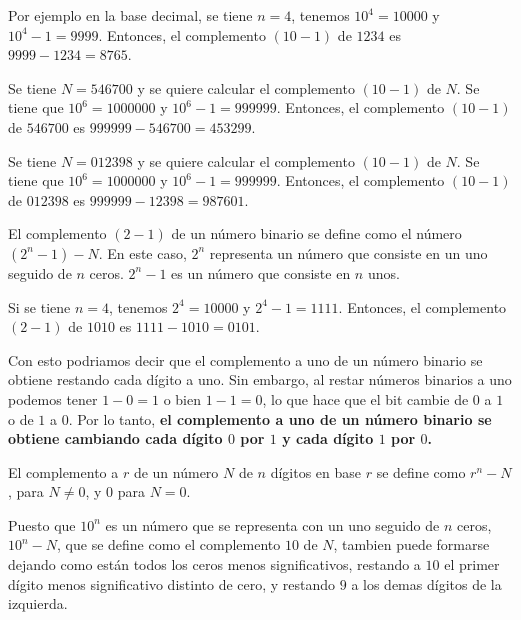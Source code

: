\begin{ejemplo}
    Por ejemplo en la base decimal, se tiene $n=4$, tenemos $10^4 = 10000$ y $10^4 - 1 = 9999$. Entonces, el complemento $(10-1)$ de $1234$ es $9999 - 1234 = 8765$.
\end{ejemplo}

\begin{ejemplo}
    Se tiene $N= 546700$ y se quiere calcular el complemento $(10-1)$ de $N$. Se tiene que $10^6 = 1000000$ y $10^6 - 1 = 999999$. Entonces, el complemento $(10-1)$ de $546700$ es $999999 - 546700 = 453299$.
\end{ejemplo}

\begin{ejemplo}
    Se tiene $N = 012398$ y se quiere calcular el complemento $(10-1)$ de $N$. Se tiene que $10^6 = 1000000$ y $10^6 - 1 = 999999$. Entonces, el complemento $(10-1)$ de $012398$ es $999999 - 12398 = 987601$.
\end{ejemplo}

\begin{observacion}
    El complemento $(2-1)$ de un número binario se define como el número $(2^n - 1) - N$. En este caso, $2^n$ representa un número que consiste en un uno seguido de $n$ ceros. $2^n -1$ es un número que consiste en $n$ unos.
\end{observacion}

\begin{ejemplo}
    Si se tiene $n=4$, tenemos $2^4 = 10000$ y $2^4 - 1 = 1111$. Entonces, el complemento $(2-1)$ de $1010$ es $1111 - 1010 = 0101$.
\end{ejemplo}
Con esto podriamos decir que el complemento a uno de un número binario se obtiene restando cada dígito a uno. Sin embargo, al restar números binarios a uno podemos tener $1-0=1$ o bien $1-1=0$, lo que hace que el bit cambie de $0$ a $1$ o de $1$ a $0$. Por lo tanto, \textbf{el complemento a uno de un número binario se obtiene cambiando cada dígito $0$ por $1$ y cada dígito $1$ por $0$.}

\begin{defi}
    El complemento a $r$ de un número $N$ de $n$ dígitos en base $r$ se define como $r^n-N$, para $N\neq 0$, y 0 para $N=0$.
\end{defi}

\begin{observacion}
    Puesto que $10^n$ es un número que se representa con un uno seguido de $n$ ceros, $10^n-N$, que se define como el complemento $10$ de $N$, tambien puede formarse dejando como están todos los ceros menos significativos, restando a $10$ el primer dígito menos significativo distinto de cero, y restando $9$ a los demas dígitos de la izquierda.
\end{observacion}

